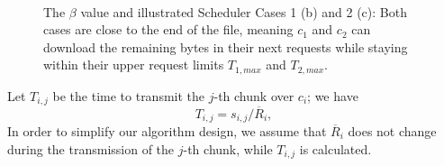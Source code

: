 \begin{figure}[t]
\begin{minipage}[t]{0.3\linewidth}
\begin{center}
        \end{center}
        \end{minipage}
~
        \begin{minipage}[t]{0.3\linewidth}
        \begin{center}
        \end{center}
        \end{minipage}
        \caption{\label{fig:scheduler-cases} The $\beta$ value and illustrated Scheduler Cases 1 (b) and 2 (c): Both cases are close to the end of the file, meaning $c_1$ and $c_2$ can download the remaining bytes in their next requests while staying within their upper request limits $T_{1,max}$ and $T_{2,max}$.}
  \vspace*{-0.3cm}
\end{figure}

Let $T_{i,j}$ be the time to transmit the $j$-th chunk over $c_i$; we have
\begin{equation}
\label{eq:time}
T_{i,j} = s_{i,j} / \overline{R}_i,
\end{equation}
In order to simplify our algorithm design, we assume that $\overline{R}_i$ does not change during the transmission of the $j$-th chunk, while $T_{i,j}$ is calculated. 

